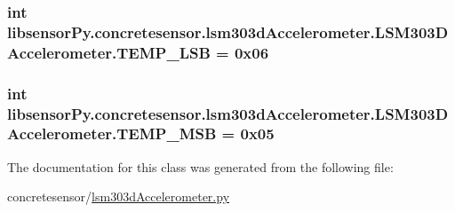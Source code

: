 \subsubsection[{T\+E\+M\+P\+\_\+\+L\+S\+B}]{\setlength{\rightskip}{0pt plus 5cm}int libsensor\+Py.\+concretesensor.\+lsm303d\+Accelerometer.\+L\+S\+M303\+D\+Accelerometer.\+T\+E\+M\+P\+\_\+\+L\+S\+B = 0x06\hspace{0.3cm}{\ttfamily [static]}}\label{classlibsensorPy_1_1concretesensor_1_1lsm303dAccelerometer_1_1LSM303DAccelerometer_a98c64990340c9aa117b4412d5aa0be10}
\hypertarget{classlibsensorPy_1_1concretesensor_1_1lsm303dAccelerometer_1_1LSM303DAccelerometer_a0a08de4e5c1089a5208a8b6f26d6cbb7}{}
\subsubsection[{T\+E\+M\+P\+\_\+\+M\+S\+B}]{\setlength{\rightskip}{0pt plus 5cm}int libsensor\+Py.\+concretesensor.\+lsm303d\+Accelerometer.\+L\+S\+M303\+D\+Accelerometer.\+T\+E\+M\+P\+\_\+\+M\+S\+B = 0x05\hspace{0.3cm}{\ttfamily [static]}}\label{classlibsensorPy_1_1concretesensor_1_1lsm303dAccelerometer_1_1LSM303DAccelerometer_a0a08de4e5c1089a5208a8b6f26d6cbb7}


The documentation for this class was generated from the following file\+:\begin{DoxyCompactItemize}
\item 
concretesensor/\hyperlink{concretesensor_2lsm303dAccelerometer_8py}{lsm303d\+Accelerometer.\+py}\end{DoxyCompactItemize}
